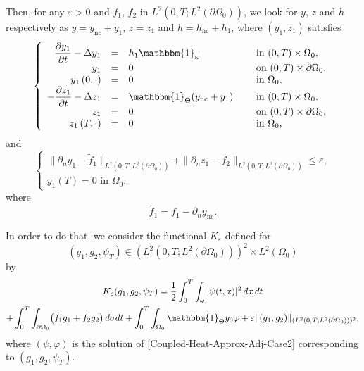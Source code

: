 \documentclass[JEP,XML,SOM,Unicode,NoFloatCountersInSection]{cedram}
\newcommand{\nc}{\mathrm{nc}}
\newcommand{\norm}[1]{\Vert#1\Vert}
\theoremstyle{definition}
\begin{document}
Then, for any $\varepsilon >0$ and $f_1$, $f_2$ in $L^2(0,T; L^2(\partial \Omega_0))$, we look for $y$, $z$ and $h$ respectively as $y = y_{\nc} + y_1$, $z = z_1$ and $h = h_{\nc} + h_1$, where $(y_1, z_1)$ satisfies
\begin{equation}
\label{y-Omega-1-h}
\left\{
\begin{array}{rcll}
\dfrac{\partial y_1}{\partial t}-\Delta y_1 &=&h_1\mathbbm{1}_{\omega}&\text{ in }(0,T) \times \Omega_0,
\\
y_1 &=& 0 &\text{ on }(0,T) \times \partial \Omega_0,
\\
y_1\left(0,\cdot\right) &=& 0 &\text{ in }\Omega_0,
\\
-\dfrac{\partial z_1}{\partial t}-\Delta z_1 &=&\mathbbm{1}_{\Theta} (y_{\nc} + y_1) \quad&\text{ in }(0,T) \times \Omega_0,
\\
z_1 &=& 0 &\text{ on }(0,T) \times \partial \Omega_0,
\\
z_1\left(T,\cdot\right) &=& 0 &\text{ in }\Omega_0,
\end{array}
\right.
\end{equation}
and
\begin{equation}
\label{Goal-NC-and-Approx-Case-2}
\begin{cases}
\| \partial_n y_1 - \tilde f_1 \|_{L^2(0,T; L^2(\partial\Omega_0))}
+
\| \partial_n z_1 - f_2 \|_{L^2(0,T; L^2(\partial\Omega_0))}
\leq\varepsilon,
\\
y_1(T) = 0 \text{ in } \Omega_0,
\end{cases}
\end{equation}
where
\begin{equation}\label{tilf}
\tilde f_1= f_1 - \partial_n y_{\nc}.
\end{equation}

In order to do that, we consider the functional $K_\varepsilon$ defined for
\[
(g_1, g_2, \psi_T) \in (L^2(0,T; L^2(\partial \Omega_0)))^2 \times L^2(\Omega_0)
\]
by
\begin{multline*}
K_{\varepsilon}(g_1, g_2, \psi_T)
=
\frac{1}{2} \int_0^T \int_\omega |\psi(t,x)|^2 \, dx\,dt
\\
+
\int_0^T \int_{\partial \Omega_0} \bigl(\tilde f_1 g_1 + f_2 g_2 \bigr) \, d\sigma dt
+
\int_0^T \int_{\Omega_0} \mathbbm{1}_{\Theta} y_0 \varphi
+
\varepsilon \norm{(g_1,g_2)}_{(L^2(0,T; L^2(\partial \Omega_0)))^2},
\end{multline*}
where $(\psi, \varphi)$ is the solution of \eqref{Coupled-Heat-Approx-Adj-Case2} {corresponding to $(g_1, g_2, \psi_T)$.}
\end{document}
